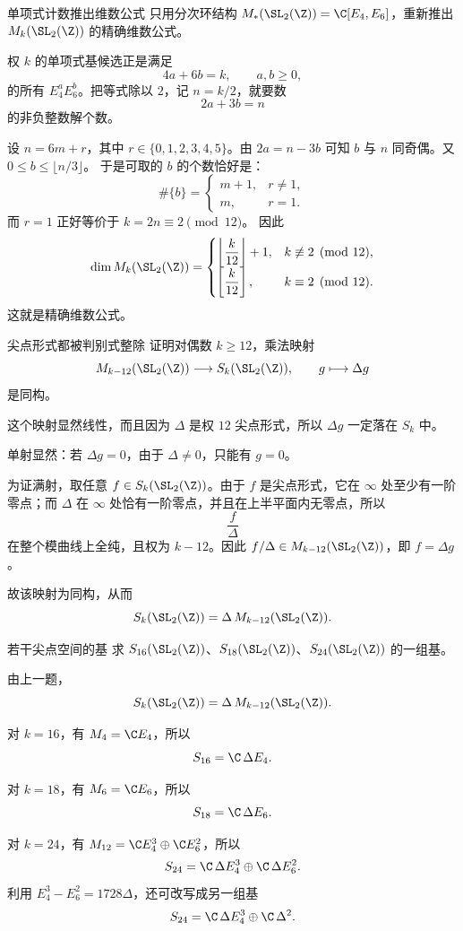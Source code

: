 \begin{problem}{单项式计数推出维数公式}
\medium
只用分次环结构 $M_*(\SL_2(\Z))=\C[E_4,E_6]$，重新推出 $M_k(\SL_2(\Z))$ 的精确维数公式。
\end{problem}
\begin{solution}
权 $k$ 的单项式基候选正是满足
\[
4a+6b=k,
\qquad a,b\ge 0,
\]
的所有 $E_4^aE_6^b$。把等式除以 $2$，记 $n=k/2$，就要数
\[
2a+3b=n
\]
的非负整数解个数。

设 $n=6m+r$，其中 $r\in\{0,1,2,3,4,5\}$。由 $2a=n-3b$ 可知 $b$ 与 $n$ 同奇偶。又 $0\le b\le \lfloor n/3\rfloor$。
于是可取的 $b$ 的个数恰好是：
\[
\#\{b\}=\begin{cases}
m+1,&r\neq 1,\\
m,&r=1.
\end{cases}
\]
而 $r=1$ 正好等价于 $k=2n\equiv 2\pmod{12}$。
因此
\[
\dim M_k(\SL_2(\Z))=
\begin{cases}
\left\lfloor\dfrac{k}{12}\right\rfloor+1,&k\not\equiv 2\pmod{12},\\
\left\lfloor\dfrac{k}{12}\right\rfloor,&k\equiv 2\pmod{12}.
\end{cases}
\]
这就是精确维数公式。
\end{solution}

\begin{problem}{尖点形式都被判别式整除}
\medium
证明对偶数 $k\ge 12$，乘法映射
\[
M_{k-12}(\SL_2(\Z))\longrightarrow S_k(\SL_2(\Z)),
\qquad g\longmapsto \Delta g
\]
是同构。
\end{problem}
\begin{solution}
这个映射显然线性，而且因为 $\Delta$ 是权 $12$ 尖点形式，所以 $\Delta g$ 一定落在 $S_k$ 中。

单射显然：若 $\Delta g=0$，由于 $\Delta\neq 0$，只能有 $g=0$。

为证满射，取任意 $f\in S_k(\SL_2(\Z))$。由于 $f$ 是尖点形式，它在 $\infty$ 处至少有一阶零点；而 $\Delta$ 在 $\infty$ 处恰有一阶零点，并且在上半平面内无零点，所以
\[
\frac{f}{\Delta}
\]
在整个模曲线上全纯，且权为 $k-12$。因此 $f/\Delta\in M_{k-12}(\SL_2(\Z))$，即 $f=\Delta g$。

故该映射为同构，从而
\[
S_k(\SL_2(\Z))=\Delta\, M_{k-12}(\SL_2(\Z)).
\]
\end{solution}

\begin{problem}{若干尖点空间的基}
\medium
求 $S_{16}(\SL_2(\Z))$、$S_{18}(\SL_2(\Z))$、$S_{24}(\SL_2(\Z))$ 的一组基。
\end{problem}
\begin{solution}
由上一题，
\[
S_k(\SL_2(\Z))=\Delta\,M_{k-12}(\SL_2(\Z)).
\]

对 $k=16$，有 $M_4=\C E_4$，所以
\[
S_{16}=\C\,\Delta E_4.
\]

对 $k=18$，有 $M_6=\C E_6$，所以
\[
S_{18}=\C\,\Delta E_6.
\]

对 $k=24$，有 $M_{12}=\C E_4^3\oplus \C E_6^2$，所以
\[
S_{24}=\C\,\Delta E_4^3\oplus \C\,\Delta E_6^2.
\]
利用 $E_4^3-E_6^2=1728\Delta$，还可改写成另一组基
\[
S_{24}=\C\,\Delta E_4^3\oplus \C\,\Delta^2.
\]
\end{solution}

